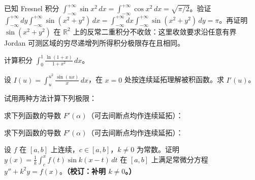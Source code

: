 \newpage
\noindent\begin{minipage}{\textwidth}
已知 Fresnel 积分 $\displaystyle\int_{-\infty}^{+\infty}\sin x^2\,dx=\int_{-\infty}^{+\infty}\cos x^2\,dx=\sqrt{\pi/2}$。验证 $\displaystyle\int_{-\infty}^{+\infty}dy\int_{-\infty}^{+\infty}\sin(x^2+y^2)\,dx=\int_{-\infty}^{+\infty}dx\int_{-\infty}^{+\infty}\sin(x^2+y^2)\,dy=\pi$。再证明 $\sin(x^2+y^2)$ 在 $\mathbb R^2$ 上的反常二重积分不收敛：这里收敛要求沿任意有界 Jordan 可测区域的穷尽递增列所得积分极限存在且相同。
\end{minipage}\par\vfill
\noindent\begin{minipage}{\textwidth}
计算积分 $\displaystyle\int_0^1\frac{\ln(1+x)}{1+x^2}\,dx$。
\end{minipage}\par\vfill
\noindent\begin{minipage}{\textwidth}
设 $\displaystyle I(u)=\int_u^{u^2}\frac{\sin(ux)}x\,dx$，在 $x=0$ 处按连续延拓理解被积函数。求 $I'(u)$。
\end{minipage}\par\vfill
\noindent\begin{minipage}{\textwidth}
试用两种方法计算下列极限：
\end{minipage}\par\vfill
\newpage
\noindent\begin{minipage}{\textwidth}
求下列函数的导数 $F'(\alpha)$（可去间断点均作连续延拓）：
\end{minipage}\par\vfill
\noindent\begin{minipage}{\textwidth}
求下列函数的导数 $F'(\alpha)$（可去间断点均作连续延拓）：
\end{minipage}\par\vfill
\noindent\begin{minipage}{\textwidth}
设 $f$ 在 $[a,b]$ 上连续，$c\in[a,b]$，$k\ne0$ 为常数。证明 $\displaystyle y(x)=\frac1k\int_c^x f(t)\sin k(x-t)\,dt$ 在 $[a,b]$ 上满足常微分方程 $y''+k^2y=f(x)$。\textbf{（校订：补明 $k\ne0$。）}
\end{minipage}\par\vfill
